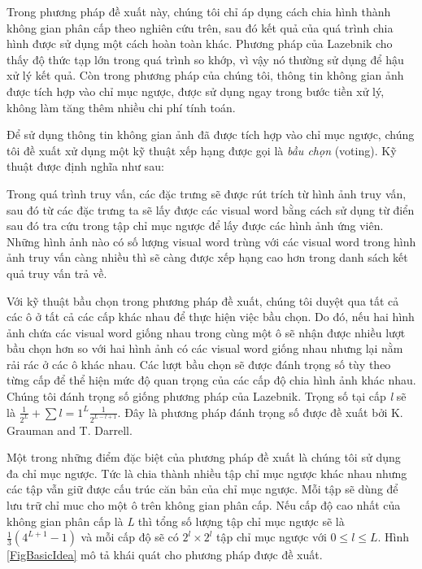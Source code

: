 Trong phương pháp đề xuất này, chúng tôi chỉ áp dụng cách chia hình thành không gian phân cấp theo nghiên cứu trên, sau đó kết quả của quá trình chia hình được sử dụng một cách hoàn toàn khác. Phương pháp của Lazebnik cho thấy độ thức tạp lớn trong quá trình so khớp, vì vậy nó thường sử dụng để hậu xử lý kết quả. Còn trong phương pháp của chúng tôi, thông tin không gian ảnh được tích hợp vào chỉ mục ngược, được sử dụng ngay trong bước tiền xử lý, không làm tăng thêm nhiều chi phí tính toán.

Để sử dụng thông tin không gian ảnh đã được tích hợp vào chỉ mục ngược, chúng tôi đề xuất xử dụng một kỹ thuật xếp hạng được gọi là \textit{bầu chọn} (voting). Kỹ thuật được định nghĩa như sau: 

Trong quá trình truy vấn, các đặc trưng sẽ được rút trích từ hình ảnh truy vấn, sau đó từ các đặc trưng ta sẽ lấy được các visual word bằng cách sử dụng từ điển sau đó tra cứu trong tập chỉ mục ngược để lấy được các hình ảnh ứng viên. Những hình ảnh nào có số lượng visual word trùng với các visual word trong hình ảnh truy vấn càng nhiều thì sẽ càng được xếp hạng cao hơn trong danh sách kết quả truy vấn trả về.

Với kỹ thuật bầu chọn trong phương pháp đề xuất, chúng tôi duyệt qua tất cả các ô ở tất cả các cấp khác nhau để thực hiện việc bầu chọn. Do đó, nếu hai hình ảnh chứa các visual word giống nhau trong cùng một ô sẽ nhận được nhiều lượt bầu chọn hơn so với hai hình ảnh có các visual word giống nhau nhưng lại nằm rải rác ở các ô khác nhau. Các lượt bầu chọn sẽ được đánh trọng số tùy theo từng cấp để thể hiện mức độ quan trọng của các cấp độ chia hình ảnh khác nhau. Chúng tôi đánh trọng số giống phương pháp của Lazebnik\cite{lazebnik2006beyond}. Trọng số tại cấp \textit{l} sẽ là $\frac{1}{2^{L}} + \sum\limits{l=1}^L \frac{1}{2^{L-l+1}}$. Đây là phương pháp đánh trọng số được đề xuất bởi K. Grauman and T. Darrell\cite{grauman2005pyramid}.

Một trong những điểm đặc biệt của phương pháp đề xuất là chúng tôi sử dụng đa chỉ mục ngược. Tức là chia thành nhiều tập chỉ mục ngược khác nhau nhưng các tập vẫn giữ được cấu trúc căn bản của chỉ mục ngược. Mỗi tập sẽ dùng để lưu trữ chỉ muc cho một ô trên không gian phân cấp. Nếu cấp độ cao nhất của không gian phân cấp là \textit{L} thì tổng số lượng tập chỉ mục ngược sẽ là $\frac{1}{3}(4^{L+1} - 1)$ và mỗi cấp độ sẽ có $2^l \times 2^l$ tập chỉ mục ngược với $0 \leq l \leq L$. Hình \ref{FigBasicIdea} mô tả khái quát cho phương pháp được đề xuất.

